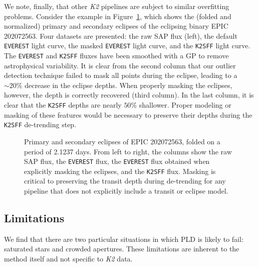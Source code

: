 \documentclass[]{emulateapj}
\begin{document}
We note, finally, that other \emph{K2} pipelines are subject to similar overfitting
problems. Consider the example in Figure~\ref{fig:202072563}, which shows 
the (folded and normalized) primary and secondary eclipses of the eclipsing binary EPIC 202072563. 
Four datasets are presented: the raw SAP flux (left), the default \texttt{EVEREST} light curve, 
the masked \texttt{EVEREST} light curve, and the \texttt{K2SFF} light curve. 
The \texttt{EVEREST} and \texttt{K2SFF} fluxes have been smoothed with a GP to 
remove astrophysical variability. It is clear from the second column that our outlier detection technique failed to 
mask all points during the eclipse, leading to a $\sim 20\%$ decrease in the eclipse
depths. When properly masking the eclipses, however, the depth is correctly recovered 
(third column). In the last column, it is clear that the \texttt{K2SFF} depths are nearly
$50\%$ shallower. Proper modeling or masking of these features would be necessary to
preserve their depths during the \texttt{K2SFF} de-trending step.

\begin{figure}[h]
  \begin{center}
       \caption{Primary and secondary eclipses of EPIC 202072563, folded
                on a period of 2.1237 days. From left to right, the columns
                show the raw SAP flux, the \texttt{EVEREST} flux, the \texttt{EVEREST}
                flux obtained when explicitly masking the eclipses, and
                the \texttt{K2SFF} flux. Masking
                is critical to preserving the transit depth during de-trending
                for any pipeline that does not explicitly include a transit or
                eclipse model.}
     \label{fig:202072563}
  \end{center}
\end{figure}

\subsection{Limitations}
\label{sec:limitations}
We find that there are two particular situations in which PLD is likely to fail: saturated stars
and crowded apertures. These limitations are inherent to the method itself and not
specific to \emph{K2} data.
\end{document}
